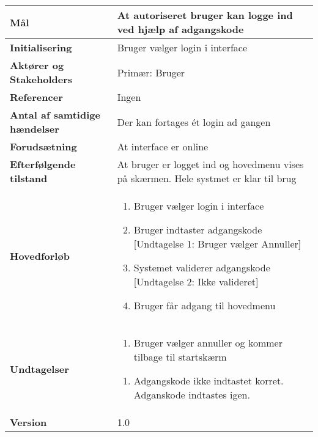 \begin{table}[H] \centering
\begin{tabular}{|p{6cm}|p{8cm}|}
	\hline
\textbf{Mål}								
&At autoriseret bruger kan logge ind ved hjælp af adgangskode
 \\\hline
\textbf{Initialisering}					
&Bruger vælger login i interface
 \\\hline
\textbf{Aktører og Stakeholders}			
&Primær: Bruger
 \\\hline
\textbf{Referencer}						
&Ingen
 \\\hline
\textbf{Antal af samtidige hændelser}	
&Der kan fortages ét login ad gangen
 \\\hline
\textbf{Forudsætning}					
&At interface er online
 \\\hline
\textbf{Efterfølgende tilstand}			
&At bruger er logget ind og hovedmenu vises på skærmen. Hele systmet er klar til brug
 \\\hline
\textbf{Hovedforløb}						
& 
\begin{enumerate}

\item Bruger vælger login i interface

\item \label{UC8und1}Bruger indtaster adgangskode [Undtagelse 1: Bruger vælger Annuller]

\item \label{UC8und2} Systemet validerer adgangskode [Undtagelse 2: Ikke valideret]

\item Bruger får adgang til hovedmenu
 
\end{enumerate}
\\\hline

\textbf{Undtagelser}						
&\begin{enumerate}[label= \ref{UC8und1}a.]
			\item Bruger vælger annuller og kommer tilbage til startskærm
		\end{enumerate}
											
		\begin{enumerate}[label= \ref{UC8und2}a.]
			\item Adgangskode ikke indtastet korret. Adganskode indtastes igen.
		\end{enumerate} \\\hline


		\textbf{Version}		&1.0 \\\hline
	\end{tabular}
	\label{UC1} 
\end{table}